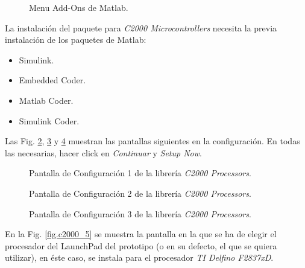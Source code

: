 \documentclass{report}
\begin{document}
\begin{figure}[!h]
    \begin{center}
    \resizebox{10Cm}{!}{\texttt{[image: c2000\_1]}}
    \caption{Menu Add-Ons de Matlab.}
    \label{fig.c2000_1} 
    \end{center}
\end{figure}

La instalación del paquete para \textit{C2000 Microcontrollers} necesita la previa instalación de los paquetes de Matlab:
\begin{itemize}
    \item Simulink.
    \item Embedded Coder. 
    \item Matlab Coder.
    \item Simulink Coder.
\end{itemize}


Las Fig. \ref{fig.c2000_2}, \ref{fig.c2000_3} y \ref{fig.c2000_4} muestran las pantallas siguientes en la configuración. En todas las necesarias, hacer click en \textit{Continuar} y \textit{Setup Now}.
\begin{figure}[!h]
    \begin{center}
    \resizebox{10Cm}{!}{\texttt{[image: c2000\_2]}}
    \caption{Pantalla de Configuración 1 de la librería \textit{C2000 Processors}.}
    \label{fig.c2000_2} 
    \end{center}
\end{figure}
\begin{figure}[!h]
    \begin{center}
    \resizebox{10Cm}{!}{\texttt{[image: c2000\_3]}}
    \caption{Pantalla de Configuración 2 de la librería \textit{C2000 Processors}.}    \label{fig.c2000_3} 
    \end{center}
\end{figure}
\begin{figure}[!h]
    \begin{center}
    \resizebox{10Cm}{!}{\texttt{[image: c2000\_4]}}
    \caption{Pantalla de Configuración 3 de la librería \textit{C2000 Processors}.}    \label{fig.c2000_4} 
    \end{center}
\end{figure}
\clearpage

En la Fig. \ref{fig.c2000_5} se muestra la pantalla en la que se ha de elegir el procesador del LaunchPad del prototipo (o en su defecto, el que se quiera utilizar), en éste caso, se instala para el procesador \textit{TI Delfino F2837xD}.
\end{document}
